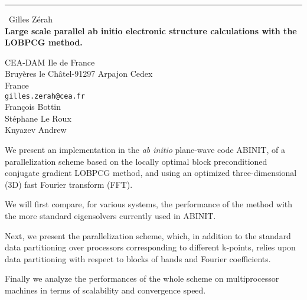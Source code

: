 \documentclass{report}
\begin{document}
\begin{center}
\rule{6in}{1pt} \
{\large Gilles Z\'{e}rah \\
{\bf Large scale parallel ab initio electronic structure calculations with the LOBPCG method.}}

CEA-DAM Ile de France \\ Bruy\`{e}res le Ch\^{a}tel-91297 Arpajon Cedex \\ France
\\
{\tt gilles.zerah@cea.fr}\\
Fran\c{c}ois Bottin\\
St\'{e}phane Le Roux\\
	Knyazev Andrew\end{center}

We present an implementation in the {\it ab initio} plane-wave code
ABINIT, of a parallelization scheme based on the locally optimal block
preconditioned conjugate gradient LOBPCG method, and using an optimized
three-dimensional (3D) fast Fourier transform (FFT).

We will first compare, for various systems, the performance of the method
with the more standard eigensolvers currently used in ABINIT.

Next, we present the parallelization scheme, which, in addition to the
standard data partitioning over processors corresponding to different
k-points, relies upon data partitioning with respect to blocks of bands
and Fourier coefficients.

Finally we analyze the performances of the whole scheme on multiprocessor
machines in terms of scalability and convergence speed.
\end{document}
